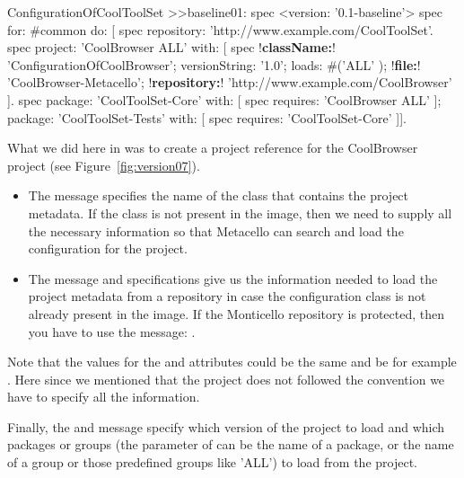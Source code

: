 \documentclass[a4paper,10pt,twoside]{book}
\begin{document}
\begin{code}{}
ConfigurationOfCoolToolSet >>baseline01: spec 
       <version: '0.1-baseline'>
       spec for: #common do: [
              spec repository: 'http://www.example.com/CoolToolSet'.
              spec project: 'CoolBrowser ALL' with: [
                            spec 
                                 !\textbf{className:}! 'ConfigurationOfCoolBrowser';
                                   versionString: '1.0';
                                   loads: #('ALL' );
                                   !\textbf{file:}! 'CoolBrowser-Metacello';
                                   !\textbf{repository:}! 'http://www.example.com/CoolBrowser' ].
              spec 
                     package: 'CoolToolSet-Core' with: [ spec requires: 'CoolBrowser ALL' ];
                     package: 'CoolToolSet-Tests' with: [ spec requires: 'CoolToolSet-Core' ]].
\end{code}       







What we did here in  was to create a project reference for the CoolBrowser project (see Figure~\ref{fig:version07}). 

\begin{itemize}
\item The message  specifies the name of the class that contains the project metadata. If the class is not present in the image, then we need to supply all the necessary information so that Metacello can search and load the configuration for the project.


\item The message  and  specifications give us the information needed to load the project metadata from a repository in case the configuration class is not already present in the image. If the Monticello repository is protected, then you have to use the message: .

\end{itemize}
Note that the values for the  and  attributes could be the same and be for example . Here since we mentioned that the project does not followed the convention we have to specify all the information. 

Finally, the  and  message specify which version of the project to load and which packages or groups (the parameter of  can be the name of a package, or the name of a group or those predefined groups like 'ALL') to load from the project. 
\end{document}
